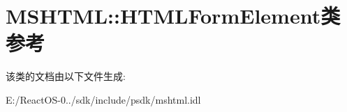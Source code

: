 \hypertarget{class_m_s_h_t_m_l_1_1_h_t_m_l_form_element}{}\section{M\+S\+H\+T\+ML\+:\+:H\+T\+M\+L\+Form\+Element类 参考}
\label{class_m_s_h_t_m_l_1_1_h_t_m_l_form_element}


该类的文档由以下文件生成\+:\begin{DoxyCompactItemize}
\item 
E\+:/\+React\+O\+S-\/0../sdk/include/psdk/mshtml.\+idl\end{DoxyCompactItemize}

